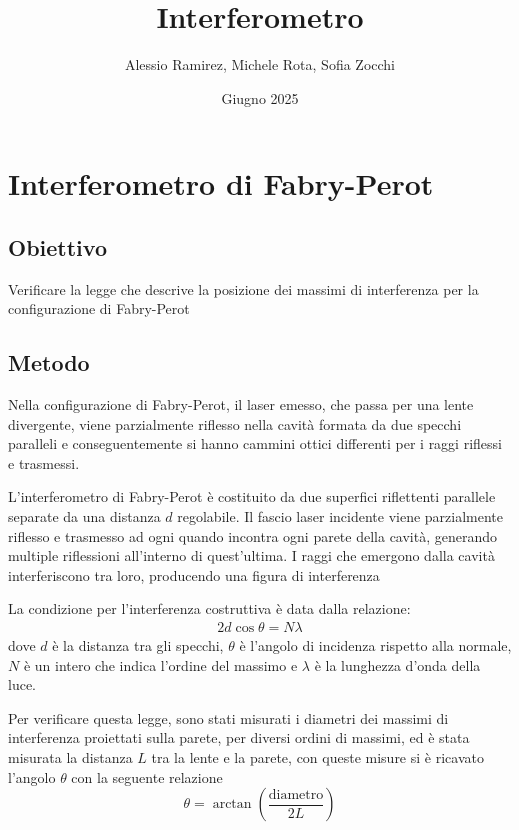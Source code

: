 \documentclass[a4paper]{article}
\title{Interferometro}
\author{Alessio Ramirez, Michele Rota, Sofia Zocchi}
\date{Giugno 2025}
\begin{document}
\maketitle
\tableofcontents

\section{Interferometro di Fabry-Perot}
\subsection{Obiettivo}
Verificare la legge che descrive la posizione dei massimi di interferenza per la configurazione di Fabry-Perot

\subsection{Metodo}
Nella configurazione di Fabry-Perot, il laser emesso, che passa per una lente divergente, viene parzialmente riflesso nella cavità formata da due specchi paralleli e conseguentemente si hanno cammini ottici differenti per i raggi riflessi e trasmessi. 

L'interferometro di Fabry-Perot è costituito da due superfici riflettenti parallele separate da una distanza $d$ regolabile. Il fascio laser incidente viene parzialmente riflesso e trasmesso ad ogni quando incontra ogni parete della cavità, generando multiple riflessioni all'interno di quest'ultima. I raggi che emergono dalla cavità interferiscono tra loro, producendo una figura di interferenza

La condizione per l'interferenza costruttiva è data dalla relazione:
\begin{align}
    2d \cos \theta = N\lambda
\end{align}
dove $d$ è la distanza tra gli specchi, $\theta$ è l'angolo di incidenza rispetto alla normale, $N$ è un intero che indica l'ordine del massimo e $\lambda$ è la lunghezza d'onda della luce.

Per verificare questa legge, sono stati misurati i diametri dei massimi di interferenza proiettati sulla parete, per diversi ordini di massimi, ed è stata misurata la distanza $L$ tra la lente e la parete, con queste misure si è ricavato l'angolo $\theta$ con la seguente relazione
\[\theta = \arctan \left(\frac{\text{diametro}}{2L}\right)\]
\end{document}

